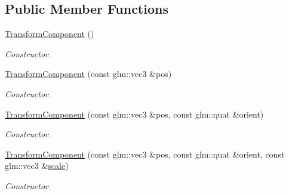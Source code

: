 \subsection*{Public Member Functions}
\begin{DoxyCompactItemize}
\item 
\mbox{\label{class_transform_component_ace1cf2d7d2a7468e9cb3eb0ce382f446}} 
\mbox{\hyperlink{class_transform_component_ace1cf2d7d2a7468e9cb3eb0ce382f446}{Transform\+Component}} ()
\begin{DoxyCompactList}\small\item\em Constructor. \end{DoxyCompactList}\item 
\mbox{\label{class_transform_component_a01037615eda19c3bbb51c99094839574}} 
\mbox{\hyperlink{class_transform_component_a01037615eda19c3bbb51c99094839574}{Transform\+Component}} (const glm\+::vec3 \&pos)
\begin{DoxyCompactList}\small\item\em Constructor. \end{DoxyCompactList}\item 
\mbox{\label{class_transform_component_a05ce9d2b5a350a5d8d67ce6b323818d4}} 
\mbox{\hyperlink{class_transform_component_a05ce9d2b5a350a5d8d67ce6b323818d4}{Transform\+Component}} (const glm\+::vec3 \&pos, const glm\+::quat \&orient)
\begin{DoxyCompactList}\small\item\em Constructor. \end{DoxyCompactList}\item 
\mbox{\label{class_transform_component_aa823162adc73870484409dcdb8cc95f3}} 
\mbox{\hyperlink{class_transform_component_aa823162adc73870484409dcdb8cc95f3}{Transform\+Component}} (const glm\+::vec3 \&pos, const glm\+::quat \&orient, const glm\+::vec3 \&\mbox{\hyperlink{class_transform_component_a4b04c6a025c6be6bd0b9400827ee2291}{scale}})
\begin{DoxyCompactList}\small\item\em Constructor. \end{DoxyCompactList}\item 
\mbox{\label{class_transform_component_a8c09c13555d6d480ef0e3af9e3231ae2}} 

\end{DoxyCompactItemize}
